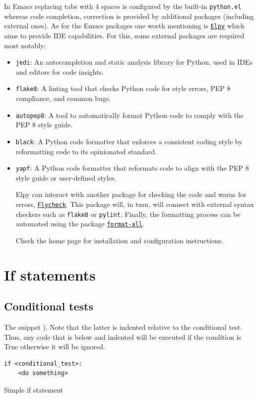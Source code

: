 \documentclass[10pt]{book}
\newenvironment{code}{\captionsetup{labelfont=bf, type=listing, name=Snippet, aboveskip=-3pt ,belowskip=15pt}}{}
\begin{document}
In Emacs replacing tabs with 4 spaces is configured by the built-in \texttt{python.el} whereas code completion, correction is provided by additional packages (including external ones).  As for the Emacs packages one worth mentioning is \href{https://github.com/jorgenschaefer/elpy}{\texttt{Elpy}} which aims to provide IDE capabilities. For this,  some external packages are required most notably:
\begin{itemize}
\item \texttt{jedi}: An autocompletion and static analysis library for Python, used in IDEs and editors for code insights.
\item \texttt{flake8}: A linting tool that checks Python code for style errors, PEP 8 compliance, and common bugs.
\item \texttt{autopep8}: A tool to automatically format Python code to comply with the PEP 8 style guide.
\item \texttt{black}: A Python code formatter that enforces a consistent coding style by reformatting code to its opinionated standard.
\item \texttt{yapf}: A Python code formatter that reformats code to align with the PEP 8 style guide or user-defined styles.

Elpy can interact with another package for checking the code and warns for errors, \href{https://www.flycheck.org/en/latest/}{\texttt{Flycheck}}. This package will, in turn, will connect with external syntax checkers such as \texttt{flake8} or \texttt{pylint}. Finally, the formatting process can be automated using the package \href{https://github.com/lassik/emacs-format-all-the-code}{\texttt{format-all}}.

Check the home page for installation and configuration instructions.
\end{itemize}
\chapter{If statements}
\label{sec:orgf0c3376}
\section{Conditional tests}
\label{sec:org0a5e0a5}
The snippet ). Note that the latter is indented relative to the conditional test. Thus, any code that is below and indented will be executed if the condition is True otherwise it will be ignored.

\label{org2d5ff54}
\begin{code}
\begin{verbatim}
if <conditional_test>:
    <do something>
\end{verbatim}
\caption{\label{lst:org9f25fdb}Simple if statement}
\end{code}
\end{document}
